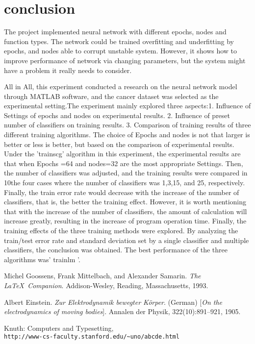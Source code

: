 \documentclass[a4paper, 12pt]{report}
\begin{document}
\section*{conclusion} 
  The project implemented neural network with different epochs, nodes and function types. The network could be trained overfitting and underfitting by epochs, and nodes able to corrupt unstable system. However, it shows how to improve performance of network via changing parameters, but the system might have a problem it really needs to consider.

 All in All, this experiment conducted a research on the neural network model through
MATLAB software, and the cancer dataset was selected as the experimental setting.The
experiment mainly explored three aspects:1. Influence of Settings of epochs and nodes
on experimental results. 2. Influence of preset number of classifiers on training results.
3. Comparison of training results of three different training algorithms.
The choice of Epochs and nodes is not that larger is better or less is better, but based on
the comparison of experimental results. Under the 'trainscg' algorithm in this
experiment, the experimental results are that when Epochs =64 and nodes=32 are the
most appropriate Settings.
Then, the number of classifiers was adjusted, and the training results were compared in
10the four cases where the number of classifiers was 1,3,15, and 25, respectively. Finally,
the train error rate would decrease with the increase of the number of classifiers, that is,
the better the training effect. However, it is worth mentioning that with the increase of
the number of classifiers, the amount of calculation will increase greatly, resulting in
the increase of program operation time.
Finally, the training effects of the three training methods were explored. By analyzing
the train/test error rate and standard deviation set by a single classifier and multiple
classifiers, the conclusion was obtained. The best performance of the three algorithms
was' trainlm '.

\cleardoublepage

\begin{thebibliography}{9}
Michel Goossens, Frank Mittelbach, and Alexander Samarin. 
\textit{The \LaTeX\ Companion}. 
Addison-Wesley, Reading, Massachusetts, 1993.
 
Albert Einstein. 
\textit{Zur Elektrodynamik bewegter K{\"o}rper}. (German) 
[\textit{On the electrodynamics of moving bodies}]. 
Annalen der Physik, 322(10):891–921, 1905.
 
Knuth: Computers and Typesetting,
\\\texttt{http://www-cs-faculty.stanford.edu/\~{}uno/abcde.html}
\end{thebibliography}
\end{document}
